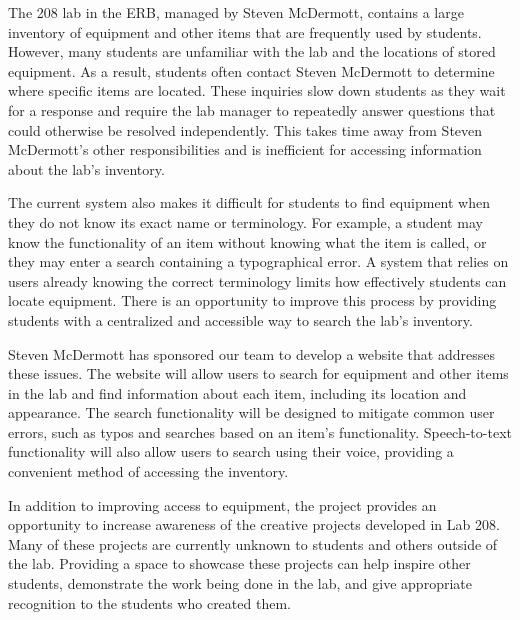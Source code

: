 The 208 lab in the ERB, managed by Steven McDermott, contains a large inventory of equipment and other items that are frequently used by students. However, many students are unfamiliar with the lab and the locations of stored equipment. As a result, students often contact Steven McDermott to determine where specific items are located. These inquiries slow down students as they wait for a response and require the lab manager to repeatedly answer questions that could otherwise be resolved independently. This takes time away from Steven McDermott's other responsibilities and is inefficient for accessing information about the lab's inventory.

The current system also makes it difficult for students to find equipment when they do not know its exact name or terminology. For example, a student may know the functionality of an item without knowing what the item is called, or they may enter a search containing a typographical error. A system that relies on users already knowing the correct terminology limits how effectively students can locate equipment. There is an opportunity to improve this process by providing students with a centralized and accessible way to search the lab's inventory.

Steven McDermott has sponsored our team to develop a website that addresses these issues. The website will allow users to search for equipment and other items in the lab and find information about each item, including its location and appearance. The search functionality will be designed to mitigate common user errors, such as typos and searches based on an item's functionality. Speech-to-text functionality will also allow users to search using their voice, providing a convenient method of accessing the inventory.

In addition to improving access to equipment, the project provides an opportunity to increase awareness of the creative projects developed in Lab 208. Many of these projects are currently unknown to students and others outside of the lab. Providing a space to showcase these projects can help inspire other students, demonstrate the work being done in the lab, and give appropriate recognition to the students who created them.